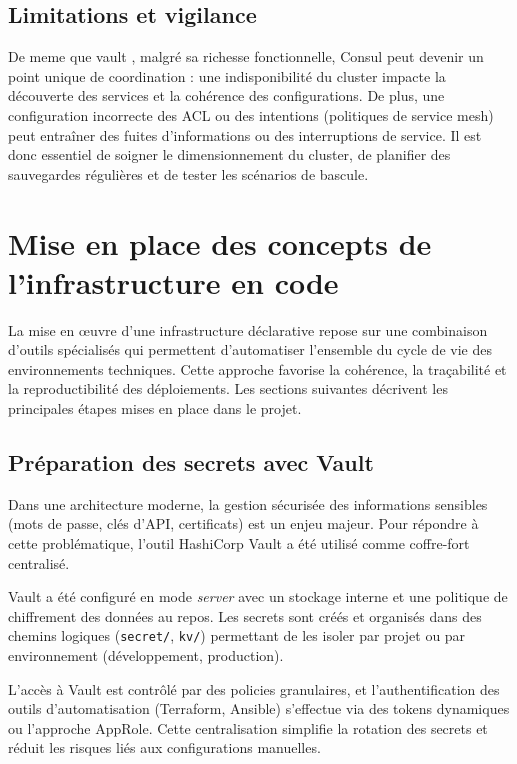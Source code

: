 \subsection{Limitations et vigilance}

De meme que vault , malgré sa richesse fonctionnelle, Consul peut devenir un point unique de coordination : une indisponibilité du cluster impacte la découverte des services et la cohérence des configurations. De plus, une configuration incorrecte des ACL ou des intentions (politiques de service mesh) peut entraîner des fuites d’informations ou des interruptions de service. Il est donc essentiel de soigner le dimensionnement du cluster, de planifier des sauvegardes régulières et de tester les scénarios de bascule.

\section{Mise en place des concepts de l'infrastructure en code}

La mise en œuvre d'une infrastructure déclarative repose sur une combinaison d'outils spécialisés qui permettent d'automatiser l'ensemble du cycle de vie des environnements techniques. Cette approche favorise la cohérence, la traçabilité et la reproductibilité des déploiements.
Les sections suivantes décrivent les principales étapes mises en place dans le projet.

\subsection{Préparation des secrets avec Vault}

Dans une architecture moderne, la gestion sécurisée des informations sensibles (mots de passe, clés d'API, certificats) est un enjeu majeur.
Pour répondre à cette problématique, l'outil HashiCorp Vault a été utilisé comme coffre-fort centralisé.

Vault a été configuré en mode \textit{server} avec un stockage interne et une politique de chiffrement des données au repos. Les secrets sont créés et organisés dans des chemins logiques (\texttt{secret/}, \texttt{kv/}) permettant de les isoler par projet ou par environnement (développement, production).

L'accès à Vault est contrôlé par des policies granulaires, et l'authentification des outils d'automatisation (Terraform, Ansible) s'effectue via des tokens dynamiques ou l'approche AppRole.
Cette centralisation simplifie la rotation des secrets et réduit les risques liés aux configurations manuelles.

